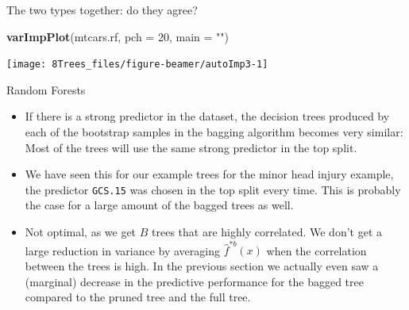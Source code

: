 \documentclass[10pt,ignorenonframetext,]{beamer}
\newenvironment{Shaded}{\begin{snugshade}}{\end{snugshade}}
\newcommand{\KeywordTok}[1]{\textcolor[rgb]{0.13,0.29,0.53}{\textbf{#1}}}
\newcommand{\DataTypeTok}[1]{\textcolor[rgb]{0.13,0.29,0.53}{#1}}
\newcommand{\DecValTok}[1]{\textcolor[rgb]{0.00,0.00,0.81}{#1}}
\newcommand{\StringTok}[1]{\textcolor[rgb]{0.31,0.60,0.02}{#1}}
\newcommand{\NormalTok}[1]{#1}
\begin{document}
\begin{frame}[fragile]

The two types together: do they agree?

\begin{Shaded}
\begin{Highlighting}[]
\KeywordTok{varImpPlot}\NormalTok{(mtcars.rf, }\DataTypeTok{pch =} \DecValTok{20}\NormalTok{, }\DataTypeTok{main =} \StringTok{""}\NormalTok{)}
\end{Highlighting}
\end{Shaded}

\begin{center}\texttt{[image: 8Trees\_files/figure-beamer/autoImp3-1]} \end{center}

\end{frame}

\begin{frame}[fragile]{Random Forests}

\begin{itemize}
\item
  If there is a strong predictor in the dataset, the decision trees
  produced by each of the bootstrap samples in the bagging algorithm
  becomes very similar: Most of the trees will use the same strong
  predictor in the top split.
\item
  We have seen this for our example trees for the minor head injury
  example, the predictor \texttt{GCS.15} was chosen in the top split
  every time. This is probably the case for a large amount of the bagged
  trees as well.
\item
  Not optimal, as we get \(B\) trees that are highly correlated. We
  don't get a large reduction in variance by averaging
  \(\hat{f}^{*b}(x)\) when the correlation between the trees is high. In
  the previous section we actually even saw a (marginal) decrease in the
  predictive performance for the bagged tree compared to the pruned tree
  and the full tree.
\end{itemize}

\end{frame}
\end{document}
